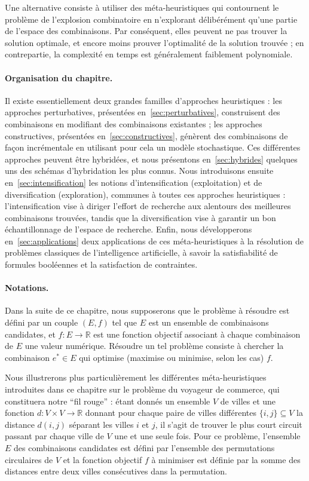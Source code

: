 \documentclass[12pt,a4paper]{book}
\begin{document}
Une alternative consiste à utiliser des méta-heuristiques qui contournent le problème de l'explosion combinatoire en n'explorant délibérément qu'une partie de l'espace des combinaisons. Par conséquent, elles peuvent ne pas trouver la solution optimale, et encore moins prouver l'optimalité de la solution trouvée ; en contrepartie, la complexité en temps est généralement faiblement polynomiale.

\paragraph{Organisation du chapitre.}
Il existe essentiellement deux grandes familles d'approches heuristiques : les approches perturbatives, présentées en~\ref{sec:perturbatives}, construisent des combinaisons en modifiant des combinaisons existantes ; les approches constructives, présentées en~\ref{sec:constructives}, génèrent des combinaisons de façon incrémentale en utilisant pour cela un modèle stochastique. Ces différentes approches peuvent être hybridées, et nous présentons en~\ref{sec:hybrides} quelques uns des schémas d'hybridation les plus connus. Nous introduisons ensuite en~\ref{sec:intensification} les notions d'intensification (exploitation) et de diversification (exploration), communes à toutes ces approches heuristiques : l'intensification vise à diriger l'effort de recherche aux alentours des meilleures combinaisons trouvées, tandis que la diversification vise à garantir un bon échantillonnage de l'espace de recherche. Enfin, nous développerons en~\ref{sec:applications} deux applications de ces méta-heuristiques à la résolution de problèmes classiques de l'intelligence artificielle, à savoir la satisfiabilité de formules booléennes et la satisfaction de contraintes.

\paragraph{Notations.}
Dans la suite de ce chapitre, nous supposerons que le problème à résoudre est défini par un couple $(E, f)$ tel que $E$ est un ensemble de combinaisons candidates, et $f : E \to \mathbb{R}$ est une fonction objectif associant à chaque combinaison de $E$ une valeur numérique. Résoudre un tel problème consiste à chercher la combinaison $e^* \in E$ qui optimise (maximise ou minimise, selon les cas) $f$.

Nous illustrerons plus particulièrement les différentes méta-heuristiques introduites dans ce chapitre sur le problème du voyageur de commerce, qui constituera notre ``fil rouge'' : étant donnés un ensemble $V$ de villes et une fonction $d : V \times V \to \mathbb{R}$ donnant pour chaque paire de villes différentes $\{i, j\} \subseteq V$ la distance $d(i, j)$ séparant les villes $i$ et $j$, il s'agit de trouver le plus court circuit passant par chaque ville de $V$ une et une seule fois. Pour ce problème, l'ensemble $E$ des combinaisons candidates est défini par l'ensemble des permutations circulaires de $V$ et la fonction objectif $f$ à minimiser est définie par la somme des distances entre deux villes consécutives dans la permutation.
\end{document}
